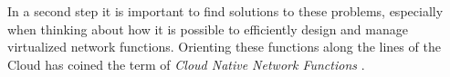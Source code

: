 In a second step it is important to find solutions to these problems, especially when thinking about how it is possible to efficiently design and manage virtualized network functions. Orienting these functions along the lines of the Cloud has coined the term of \textit{Cloud Native Network Functions} \cite{CNF} \cite{inproceedings} \cite{evolutionnfv}. 
